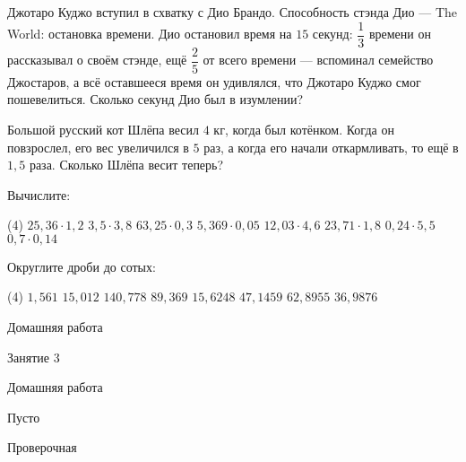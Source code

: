 \begin{class}[number=2]
	\begin{listofex}
		\item Джотаро Куджо вступил в схватку с Дио Брандо. Способность стэнда Дио --- The World: остановка времени. Дио остановил время на \( 15 \) секунд: \( \dfrac{1}{3} \) времени он рассказывал о своём стэнде, ещё \( \dfrac{2}{5} \) от всего времени --- вспоминал семейство Джостаров, а всё оставшееся время он удивлялся, что Джотаро Куджо смог пошевелиться. Сколько секунд Дио был в изумлении?
		\item Большой русский кот Шлёпа весил \( 4 \) кг, когда был котёнком. Когда он повзрослел, его вес увеличился в \( 5 \) раз, а когда его начали откармливать, то ещё в \( 1,5\) раза. Сколько Шлёпа весит теперь?
		\item Вычислите:
		\begin{tasks}(4)
			\task \( 25,36\cdot1,2 \)
			\task \( 3,5\cdot3,8 \)
			\task \( 63,25\cdot0,3 \)
			\task \( 5,369\cdot0,05 \)
			\task \( 12,03\cdot4,6 \)
			\task \( 23,71\cdot1,8 \)
			\task \( 0,24\cdot5,5 \)
			\task \( 0,7\cdot0,14 \)
		\end{tasks}
		\item Округлите дроби до сотых:
		\begin{tasks}(4)
			\task \( 1,561 \)
			\task \( 15,012 \)
			\task \( 140,778 \)
			\task \( 89,369 \)
			\task \( 15,6248 \)
			\task \( 47,1459 \)
			\task \( 62,8955 \)
			\task \( 36,9876 \)
		\end{tasks}
	\end{listofex}
\end{class}

\begin{homework}[number=2]
	\begin{listofex}
		\item Домашняя работа
	\end{listofex}
\end{homework}

\begin{class}[number=3]
	\begin{listofex}
		\item Занятие 3
	\end{listofex}
\end{class}

\begin{homework}[number=3]
	\begin{listofex}
		\item Домашняя работа
	\end{listofex}
\end{homework}

\begin{class}[number=4]
	\begin{listofex}
		\item Пусто
	\end{listofex}
\end{class}


\begin{exam}
	\begin{listofex}
		\item Проверочная
	\end{listofex}
\end{exam}

